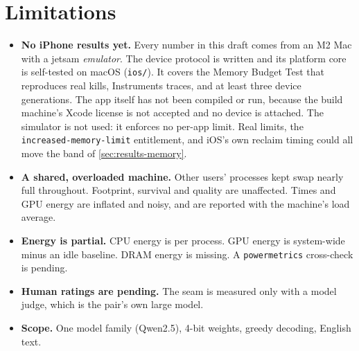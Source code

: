 \section{Limitations}\label{sec:limits}
\begin{itemize}
\item \textbf{No iPhone results yet.}
Every number in this draft comes from an M2 Mac with a jetsam \emph{emulator}.
The device protocol is written and its platform core is self-tested on macOS (\texttt{ios/}).
It covers the Memory Budget Test that reproduces real kills, Instruments traces, and at least three device generations.
The app itself has not been compiled or run, because the build machine's Xcode license is not accepted and no device is attached.
The simulator is not used: it enforces no per-app limit.
Real limits, the \texttt{increased-memory-limit} entitlement, and iOS's own reclaim timing could all move the band of \cref{sec:results-memory}.
\item \textbf{A shared, overloaded machine.}
Other users' processes kept swap nearly full throughout.
Footprint, survival and quality are unaffected.
Times and GPU energy are inflated and noisy, and are reported with the machine's load average.
\item \textbf{Energy is partial.}
CPU energy is per process.
GPU energy is system-wide minus an idle baseline.
DRAM energy is missing.
A \texttt{powermetrics} cross-check is pending.
\item \textbf{Human ratings are pending.}
The seam is measured only with a model judge, which is the pair's own large model.
\item \textbf{Scope.} One model family (Qwen2.5), 4-bit weights, greedy decoding, English text.
\end{itemize}
